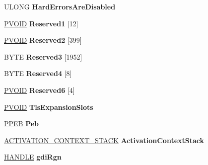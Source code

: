 \begin{DoxyCompactItemize}
\item 
\mbox{\label{struct___t_e_b_a6fc0cde770574d0ddd53e41d101ae5c1}} 
U\+L\+O\+NG {\bfseries Hard\+Errors\+Are\+Disabled}
\item 
\mbox{\label{struct___t_e_b_a38ddaaaf191c921638b7349d37c19481}} 
\hyperlink{interfacevoid}{P\+V\+O\+ID} {\bfseries Reserved1} \mbox{[}12\mbox{]}
\item 
\mbox{\label{struct___t_e_b_a3cffe2125ec21d402fcb7e8556353470}} 
\hyperlink{interfacevoid}{P\+V\+O\+ID} {\bfseries Reserved2} \mbox{[}399\mbox{]}
\item 
\mbox{\label{struct___t_e_b_ad635756fbd05306f51c44209d2c43c3e}} 
B\+Y\+TE {\bfseries Reserved3} \mbox{[}1952\mbox{]}
\item 
\mbox{\label{struct___t_e_b_a9daf12460955db2338bb613de237e82b}} 
B\+Y\+TE {\bfseries Reserved4} \mbox{[}8\mbox{]}
\item 
\mbox{\label{struct___t_e_b_a0195775421e29e112183e3d3bfae00dc}} 
\hyperlink{interfacevoid}{P\+V\+O\+ID} {\bfseries Reserved6} \mbox{[}4\mbox{]}
\item 
\mbox{\label{struct___t_e_b_a6db37a868146ac1f4396c241992614a3}} 
\hyperlink{interfacevoid}{P\+V\+O\+ID} {\bfseries Tls\+Expansion\+Slots}
\item 
\mbox{\label{struct___t_e_b_a3cc77871a51df895c3aea61c74dd199b}} 
\hyperlink{struct___p_e_b}{P\+P\+EB} {\bfseries Peb}
\item 
\mbox{\label{struct___t_e_b_a04a1c357f0b0acb85c5908be36e3c282}} 
\hyperlink{struct___a_c_t_i_v_a_t_i_o_n___c_o_n_t_e_x_t___s_t_a_c_k}{A\+C\+T\+I\+V\+A\+T\+I\+O\+N\+\_\+\+C\+O\+N\+T\+E\+X\+T\+\_\+\+S\+T\+A\+CK} {\bfseries Activation\+Context\+Stack}
\item 
\mbox{\label{struct___t_e_b_a1725089b39ae73c477ef0d9ef058c87e}} 
\hyperlink{interfacevoid}{H\+A\+N\+D\+LE} {\bfseries gdi\+Rgn}
\item 
\mbox{\label{struct___t_e_b_a06454ea3886bd6537353b9c2f41116b1}} 

\end{DoxyCompactItemize}
